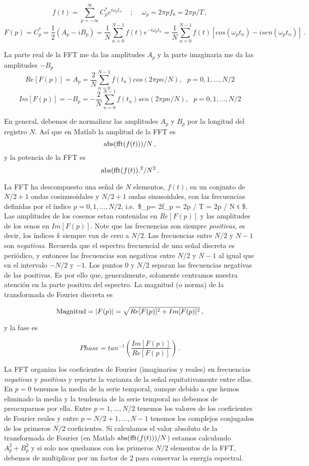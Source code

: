 \documentclass[
]{agujournal2019}
\begin{document}
\[f(t)=\sum\limits^\infty_{p=-\infty} C^*_p e^{i\omega_p t_n}\,\,\,\,\,\,\,;\,\,\,\,\,\,\,\omega_p=2 \pi p f_0=2\pi p/T\,,\]
\[F(p)=C^*_p=\frac{1}{2}(A_p-iB_p)=\frac{1}{N} \sum\limits^{N-1}_{n=0} f(t) e^{-i \omega_p t_n} =
        \frac{1}{N} \sum\limits^{N-1}_{n=0}f(t) [cos(\omega_p t_n) - isen(\omega_p t_n) ]\,.\]

La parte real de la FFT me da las amplitudes \(A_p\) y la parte
imaginaria me da las amplitudes \(-B_p\)
\[Re [F(p)]=A_p=\frac{2}{N}\sum\limits_{n=0}^{N-1} f(t_n) cos(2\pi p n /N),\,\,\,\,p=0,1,...,N/2\]
\[Im [F(p)]=-B_p=-\frac{2}{N}\sum\limits_{n=0}^{N-1} f(t_n) sen(2\pi p n /N),\,\,\,\,p=0,1,...,N/2\]

En general, debemos de normalizar las amplitudes \(A_p\) y \(B_p\) por
la longitud del registro \(N\). Así que en Matlab la amplitud de la FFT
es \[{\rm abs}({\rm fft}(f(t)))/N\,,\] y la potencia de la FFT es
\[{\rm abs}({\rm fft}(f(t)).^2/N^2\,.\]

La FFT ha descompuesto una señal de \(N\) elementos, \(f(t)\), en un
conjunto de \(N/2 +1\) ondas cosinusoidales y \(N/2 + 1\) ondas
sinusoidales, con las frecuencias definidas por el índice
\(p=0,1,...,N/2\), i.e.~\$\omega\_p= 2\pi f\_p = 2\pi p / T = 2\pi p / N
\Delta t \$. Las amplitudes de los cosenos estan contenidas en
\(Re [F(p)]\) y las amplitudes de los senos en \(Im [F(p)]\). Note que
las frecuencias son siempre \emph{positivas}, es decir, los índices
\(k\) siempre van de cero a \(N/2\). Las frecuencias entre \(N/2\) y
\(N-1\) son \emph{negativas}. Recuerda que el espectro frecuencial de
una señal discreta es periódico, y entonces las frecuencias son
negativas entre \(N/2\) y \(N-1\) al igual que en el intervalo \(-N/2\)
y \(-1\). Los puntos \(0\) y \(N/2\) separan las frecuencias negativas
de las positivas. Es por ello que, generalmente, solamente centramos
nuestra atención en la parte positiva del espectro. La magnitud (o
norma) de la transformada de Fourier discreta es

\[{\rm Magnitud}=|F(p)|=\sqrt{Re [F(p)]^2 + Im[F(p)]^2}\,,\]

y la fase es

\[Phase=tan^{-1}\left( \frac{Im[F(p)]}{Re [F(p)]} \right)\,.\]

La FFT organiza los coeficientes de Fourier (imaginarios y reales) en
frecuencias \emph{negativas} y \emph{positivas} y reparte la varianza de
la señal equitativamente entre ellas. En \(p=0\) tenemos la media de la
serie temporal, aunque debido a que hemos eliminado la media y la
tendencia de la serie temporal no debemos de preocuparnos por ella.
Entre \(p=1,...,N/2\) tenemos los valores de los coeficientes de Fourier
reales y entre \(p=N/2+1,...,N-1\) tenemos los complejos conjugados de
los primeros \(N/2\) coeficientes. Si calculamos el valor absoluto de la
transformada de Fourier (en Matlab \({\rm abs}({\rm fft}(f(t)))/N\))
estamos calculando \(A_p^2 + B_p^2\) y si solo nos quedamos con los
primeros \(N/2\) elementos de la FFT, debemos de multiplicar por un
factor de \(2\) para conservar la energía espectral.
\end{document}
